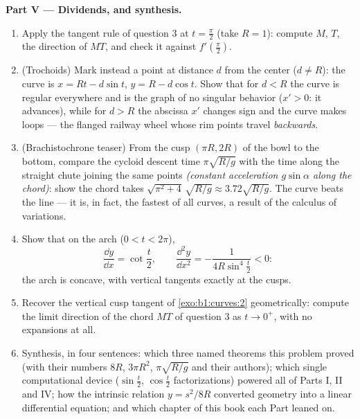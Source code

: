 \begin{problem}
\medskip
\noindent\textbf{Part V --- Dividends, and synthesis.}
\begin{enumerate}[resume]
  \item Apply the tangent rule of question 3 at $t =
        \frac\pi2$ (take $R = 1$): compute $M$, $T$, the
        direction of $MT$, and check it against
        $f'(\frac\pi2)$.
  \item (Trochoids) Mark instead a point at distance $d$ from
        the center ($d \neq R$): the curve is $x = Rt -
        d\sin t$, $y = R - d\cos t$. Show that for $d < R$ the
        curve is regular everywhere and is the graph of no
        singular behavior ($x' > 0$: it advances), while for $d
        > R$ the abscissa $x'$ changes sign and the curve makes
        loops --- the flanged railway wheel whose rim points
        travel \emph{backwards}.
  \item (Brachistochrone teaser) From the cusp $(\pi R, 2R)$ of
        the bowl to the bottom, compare the cycloid descent time
        $\pi\sqrt{R/g}$ with the time along the straight chute
        joining the same points \emph{(constant acceleration
        $g\sin\alpha$ along the chord)}: show the chord takes
        $\sqrt{\pi^2 + 4}\,\sqrt{R/g} \approx 3.72\sqrt{R/g}$.
        The curve beats the line --- it is, in fact, the fastest
        of all curves, a result of the calculus of variations.
  \item Show that on the arch ($0 < t < 2\pi$),
        \[
        \frac{\dd y}{\dd x} = \cot\frac t2,
        \qquad
        \frac{\dd^2 y}{\dd x^2} =
        -\frac{1}{4R\sin^4\frac t2} < 0 :
        \]
        the arch is concave, with vertical tangents exactly at
        the cusps.
  \item Recover the vertical cusp tangent of
        \cref{exo:b1:curves:2} geometrically: compute the limit
        direction of the chord $MT$ of question 3 as $t \to
        0^{+}$, with no expansions at all.
  \item Synthesis, in four sentences: which three named theorems
        this problem proved (with their numbers $8R$, $3\pi
        R^2$, $\pi\sqrt{R/g}$ and their authors); which single
        computational device ($\sin\frac t2$, $\cos\frac t2$
        factorizations) powered all of Parts I, II and IV; how
        the intrinsic relation $y = s^2/8R$ converted geometry
        into a linear differential equation; and which chapter
        of this book each Part leaned on.
\end{enumerate}
\end{problem}
